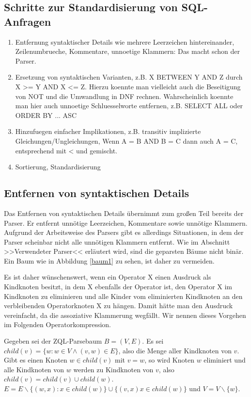 \subsection*{Schritte zur Standardisierung von SQL-Anfragen}

\begin{enumerate}
\item Entfernung syntaktischer Details wie mehrere Leerzeichen
    hintereinander, Zeilenumbrueche, Kommentare,
    unnoetige Klammern: Das macht schon der Parser.
\item Ersetzung von syntaktischen Varianten,
    z.B. X BETWEEN Y AND Z durch X >= Y AND X <= Z.
    Hierzu koennte man vielleicht auch die Beseitigung von NOT
    und die Umwandlung in DNF rechnen.
    Wahrscheinlich koennte man hier auch unnoetige Schluesselworte
    entfernen, z.B. SELECT ALL oder ORDER BY ... ASC
\item Hinzufuegen einfacher Implikationen,
    z.B. transitiv implizierte Gleichungen/Ungleichungen,
    Wenn A = B AND B = C dann auch A = C,
    entsprechend mit < und gemischt.
\item Sortierung, Standardisierung 
\end{enumerate}

\subsection{Entfernen von syntaktischen Details}

Das Entfernen von syntaktischen Details übernimmt zum großen Teil bereits der Parser. Er entfernt unnötige Leerzeichen, Kommentare sowie unnötige Klammern. Aufgrund der Arbeitsweise des Parsers gibt es allerdings Situationen, in dem der Parser scheinbar nicht alle unnötigen Klammern entfernt. Wie im Abschnitt >>Verwendeter Parser<< erläutert wird, sind die geparsten Bäume nicht binär. Ein Baum wie in Abbildung \ref{baum1} zu sehen, ist daher zu vermeiden. 

Es ist daher wünschenswert, wenn ein Operator X einen Ausdruck als Kindknoten besitzt, in dem X ebenfalls der Operator ist, den Operator X im Kindknoten zu eliminieren und alle Kinder vom eliminierten Kindknoten an den verbleibenden Operatorknoten X zu hängen. Damit hätte man den Ausdruck vereinfacht, da die assoziative Klammerung wegfällt. Wir nennen dieses Vorgehen im Folgenden Operatorkompression.

Gegeben sei der ZQL-Parsebaum $B=(V,E)$. Es sei $child(v) = \{ w : w\in V \wedge (v,w)\in E\}$, also die Menge aller Kindknoten von $v$. Gibt es einen Knoten $w\in child(v)$ mit $v=w$, so wird Knoten $w$ eliminiert und alle Kindknoten von $w$ werden zu Kindknoten von $v$, also $child(v) = child(v) \cup child(w)$. 
$E=E\backslash \{ (w,x) : x\in child(w)\} \cup \{(v,x) x\in child(w)\}$ und $V=V\backslash \{w\}$.

